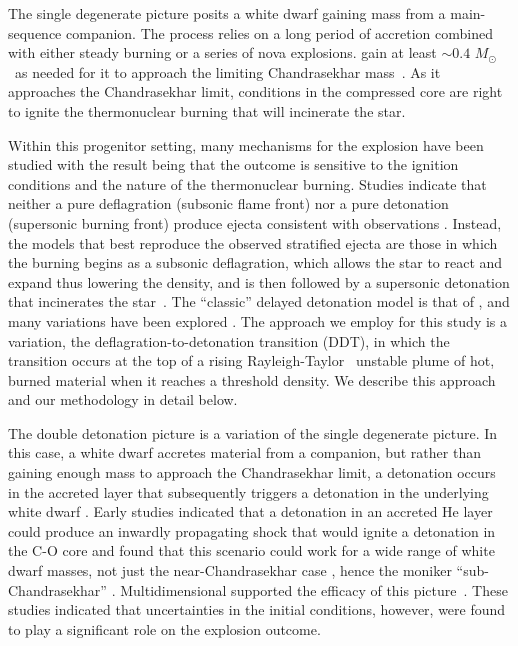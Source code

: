 \documentclass[iop,apj]{emulateapj}
\newcommand{\Msun}{\ensuremath{M_\odot}}
\begin{document}
The single degenerate picture posits a white dwarf gaining mass
from a main-sequence companion. The process relies on a long
period of accretion combined with either steady burning or a 
series of nova explosions.  gain at least
$\sim 0.4$ \Msun\ as needed for it to approach the
limiting Chandrasekhar mass~\citep{starrfieldetal2012}. As it approaches
the Chandrasekhar limit, conditions in the compressed core are right
to ignite the thermonuclear burning that will incinerate the star. 

Within this progenitor setting, many mechanisms for the explosion have 
been studied with the result being that the outcome is sensitive to
the ignition conditions and the nature of the thermonuclear burning.
Studies indicate that neither a pure deflagration (subsonic flame front)
nor a pure detonation (supersonic burning front) produce ejecta consistent
with observations \citep{arnett69,roepkeetal07}.  Instead, the models 
that best reproduce the observed stratified ejecta are those in which 
the burning begins as a subsonic deflagration, which allows the star 
to react and expand thus lowering the density, and is then followed by a 
supersonic detonation that incinerates the 
star~\citep{Nomo84,Khokhlov1991Delayed-detonat,HoefKhok96,GameKhokOran05}.
The ``classic'' delayed detonation model is that of 
\citet{Khokhlov1991Delayed-detonat} \citep[See also][]{hoflich.khokhlov.ea:delayed,GameKhokOran05},
and many variations have been 
explored \citep[and references therein]{hillebrandtetal2013,calderetal2013}.
The approach we employ for this study is a variation, the 
deflagration-to-detonation transition (DDT), in which the transition
occurs at the top of a rising Rayleigh-Taylor~\citep{taylor+50,chandra+81} 
unstable plume of hot, burned 
material when it reaches a threshold density.
We describe this approach and our methodology in detail below.

The double detonation picture is a variation of the single degenerate picture.
In this case, a white dwarf accretes material from a companion, but rather
than gaining enough mass to approach the Chandrasekhar limit, a detonation
occurs in the accreted layer that subsequently triggers a detonation
in the underlying white dwarf \citet{woosleyweavertaam80,taam80a,taam80b,
nomoto80,nomoto82b}. Early studies indicated that a detonation in an 
accreted He
layer could produce an inwardly propagating
shock that would ignite a detonation in the C-O core and found
that this scenario could work for a wide range of white dwarf
masses, not just the near-Chandrasekhar case \citep{livne90}, hence the
moniker ``sub-Chandrasekhar'' \citep{ww94}. Multidimensional supported the
efficacy of this picture~\citep{livneglasner91, livnearnett95,HoefKhok96,
hoeflichetal96, wigginsfalle97,wigginsetal98,garciasenzbravowoosley99}. 
These studies indicated that uncertainties in the initial conditions, 
however, were found to play a significant role on the explosion outcome. 
\end{document}
